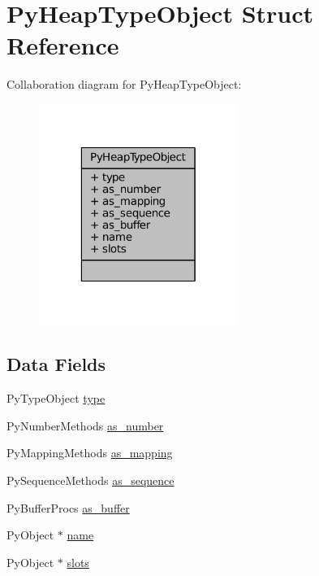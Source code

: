 \hypertarget{struct_py_heap_type_object}{\section{Py\-Heap\-Type\-Object Struct Reference}
\label{struct_py_heap_type_object}
}


Collaboration diagram for Py\-Heap\-Type\-Object\-:
\nopagebreak
\begin{figure}[H]
\begin{center}
\leavevmode
\includegraphics[width=184pt]{struct_py_heap_type_object__coll__graph}
\end{center}
\end{figure}
\subsection*{Data Fields}
\begin{DoxyCompactItemize}
\item 
Py\-Type\-Object \hyperlink{struct_py_heap_type_object_ab95029e45ed9e584a319da3910e6d36a}{type}
\item 
Py\-Number\-Methods \hyperlink{struct_py_heap_type_object_ae0163a9a768a792c634d23bc9f665731}{as\-\_\-number}
\item 
Py\-Mapping\-Methods \hyperlink{struct_py_heap_type_object_a21b313b07bf28b7521a963b9d356042e}{as\-\_\-mapping}
\item 
Py\-Sequence\-Methods \hyperlink{struct_py_heap_type_object_adce47a2fa55f6780397cc0f84852dbb8}{as\-\_\-sequence}
\item 
Py\-Buffer\-Procs \hyperlink{struct_py_heap_type_object_abe4978c8aa7ef37a8da46660d4ab34e0}{as\-\_\-buffer}
\item 
Py\-Object $\ast$ \hyperlink{struct_py_heap_type_object_ab3978d96531ad97f1c3139b11f771f98}{name}
\item 
Py\-Object $\ast$ \hyperlink{struct_py_heap_type_object_a7127cc956fe3cde2a6dddc6f50345417}{slots}
\end{DoxyCompactItemize}



